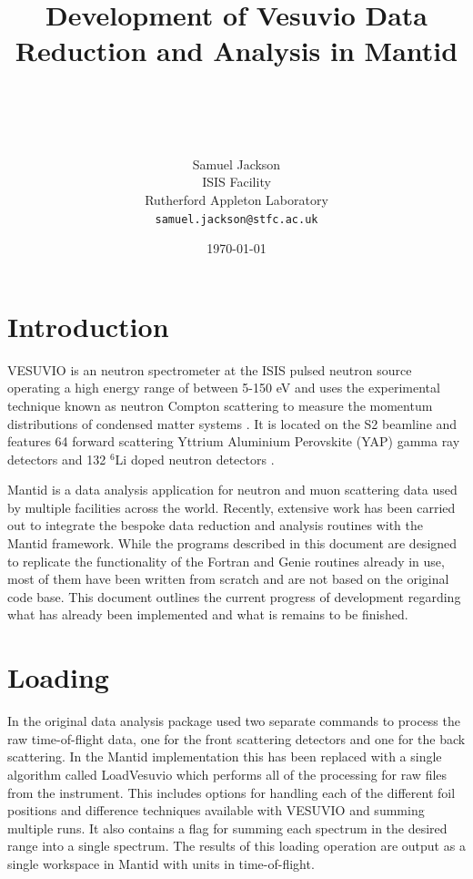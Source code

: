\documentclass[paper=a4, fontsize=11pt]{scrartcl}	%
\title{ \vspace{-1in} 	\usefont{OT1}{bch}{b}{n}
		\huge \strut Development of Vesuvio Data Reduction and Analysis in Mantid \strut \\
}
\author{ 									\usefont{OT1}{bch}{m}{n}
        Samuel Jackson\\		\usefont{OT1}{bch}{m}{n}
        ISIS Facility\\	\usefont{OT1}{bch}{m}{n}
        Rutherford Appleton Laboratory\\
        \texttt{samuel.jackson@stfc.ac.uk}
}
\date{\today}
\numberwithin{equation}{section}															%
\numberwithin{figure}{section}																%
\numberwithin{table}{section}
\begin{document}
\maketitle
\clearpage
\tableofcontents
\clearpage
\section{Introduction}
\label{sec:introduction}
VESUVIO is an neutron spectrometer at the ISIS pulsed neutron source operating a high energy range of between 5-150 eV and uses the experimental technique known as neutron Compton scattering to measure the momentum distributions of condensed matter systems \citep{mayers2012vesuvio}. It is located on the S2 beamline and features 64 forward scattering Yttrium Aluminium Perovskite (YAP) gamma ray detectors and 132 $^{6}$Li doped neutron detectors \citep{mayers2011calibration}.

Mantid \citep{mantid} is a data analysis application for neutron and muon scattering data used by multiple facilities across the world. Recently, extensive work has been carried out to integrate the bespoke data reduction and analysis routines with the Mantid framework. While the programs described in this document are designed to replicate the functionality of the Fortran and Genie routines already in use, most of them have been written from scratch and are not based on the original code base. This document outlines the current progress of development regarding what has already been implemented and what is remains to be finished.

\section{Loading}
\label{sec:loading}
In the original data analysis package used two separate commands to process the raw time-of-flight data, one for the front scattering detectors and one for the back scattering. In the Mantid implementation this has been replaced with a single algorithm called LoadVesuvio which performs all of the processing for raw files from the instrument. This includes options for handling each of the different foil positions and difference techniques available with VESUVIO \citep{schooneveld2006foil, mayers2004vesuvio} and summing multiple runs. It also contains a flag for summing each spectrum in the desired range into a single spectrum. The results of this loading operation are output as a single workspace in Mantid with units in time-of-flight.
\end{document}
